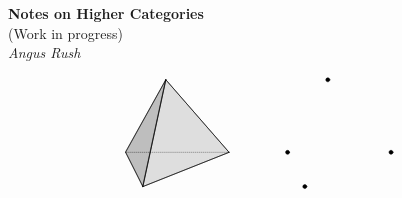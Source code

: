 \documentclass[a4paper,12pt]{scrbook}
\begin{document}
\begin{titlepage}
   \begin{center}
     \Huge\textbf{Notes on Higher Categories}\\
     (Work in progress) \\
     \vspace*{1em}
     \Large\textit{Angus Rush}
   \end{center}
   \begin{equation*}
     \begin{aligned}
       \begin{tikzpicture}[line join = round, scale=1.5, line cap = round]
         \coordinate (3) at (0,{sqrt(2)},0);
         \coordinate (2) at ({-.5*sqrt(3)},0,-.5);
         \coordinate (1) at (0,0,1);
         \coordinate (0) at ({.5*sqrt(3)},0,-.5);

         \draw[densely dotted,] (0)--(2);
         \draw[fill=lightgray,fill opacity=.5] (1)--(0)--(3)--cycle;
         \draw[fill=gray,fill opacity=.5] (2)--(1)--(3)--cycle;
         \draw (1)--(0);
         \draw (1)--(2);
         \draw (2)--(3);
         \draw (1)--(3);
         \draw (0)--(3);
       \end{tikzpicture}
     \end{aligned}
     \qquad\qquad
     \begin{aligned}
       \begin{tikzpicture}[dot/.style={draw,circle,minimum size=1mm,inner sep=0pt,outer sep=0pt,fill=black}, line join = round, scale=1.5, line cap = round]

         \coordinate[draw, dot] (3) at (0,{sqrt(2)},0);
         \coordinate[draw, dot] (2) at ({.5*sqrt(3)},0,-.5);
         \coordinate[draw, dot] (1) at (0,0,1);
         \coordinate[draw, dot] (0) at ({-.5*sqrt(3)},0,-.5);


\end{tikzpicture}
\end{aligned}
\end{equation*}
\end{titlepage}
\end{document}
